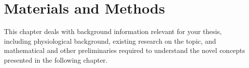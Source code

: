 \chapter{Materials and Methods}
\label{chap:materials-and-methods}

This chapter deals with background information relevant for your thesis, including physiological background, existing research on the topic, and mathematical and other preliminaries required to understand the novel concepts presented in the following chapter.

